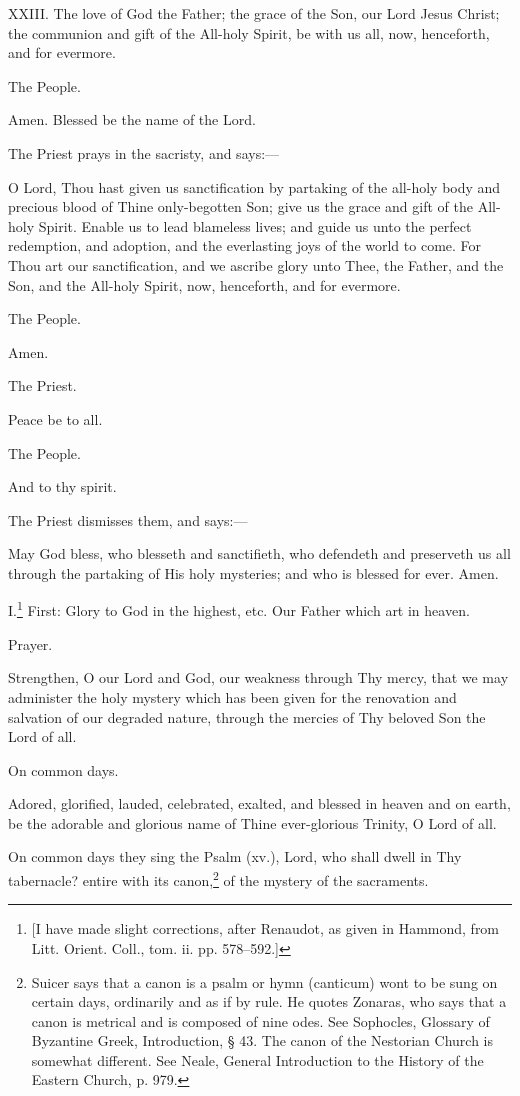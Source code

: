 XXIII. The love of God the Father; the grace of the Son, our Lord Jesus Christ; the communion and gift of the All-holy Spirit, be with us all, now, henceforth, and for evermore.

The People.

Amen. Blessed be the name of the Lord.

The Priest prays in the sacristy, and says:—

O Lord, Thou hast given us sanctification by partaking of the all-holy body and precious blood of Thine only-begotten Son; give us the grace and gift of the All-holy Spirit. Enable us to lead blameless lives; and guide us unto the perfect redemption, and adoption, and the everlasting joys of the world to come. For Thou art our sanctification, and we ascribe glory unto Thee, the Father, and the Son, and the All-holy Spirit, now, henceforth, and for evermore.

The People.

Amen.

The Priest.

Peace be to all.

The People.

And to thy spirit.

The Priest dismisses them, and says:—

May God bless, who blesseth and sanctifieth, who defendeth and preserveth us all through the partaking of His holy mysteries; and who is blessed for ever. Amen.


I.\footnote{\par{}  [I have made slight corrections, after Renaudot, as given in Hammond, from Litt. Orient. Coll., tom. ii. pp. 578–592.]} First: Glory to God in the highest, etc. Our Father which art in heaven.

Prayer.

Strengthen, O our Lord and God, our weakness through Thy mercy, that we may administer the holy mystery which has been given for the renovation and salvation of our degraded nature, through the mercies of Thy beloved Son the Lord of all.

On common days.

Adored, glorified, lauded, celebrated, exalted, and blessed in heaven and on earth, be the adorable and glorious name of Thine ever-glorious Trinity, O Lord of all.

On common days they sing the Psalm (xv.), Lord, who shall dwell in Thy tabernacle? entire with its canon,\footnote{\par  Suicer says that a canon is a psalm or hymn (canticum) wont to be sung on certain days, ordinarily and as if by rule. He quotes Zonaras, who says that a canon is metrical and is composed of nine odes. See Sophocles, Glossary of Byzantine Greek, Introduction, § 43. The canon of the Nestorian Church is somewhat different. See Neale, General Introduction to the History of the Eastern Church, p. 979.} of the mystery of the sacraments.


